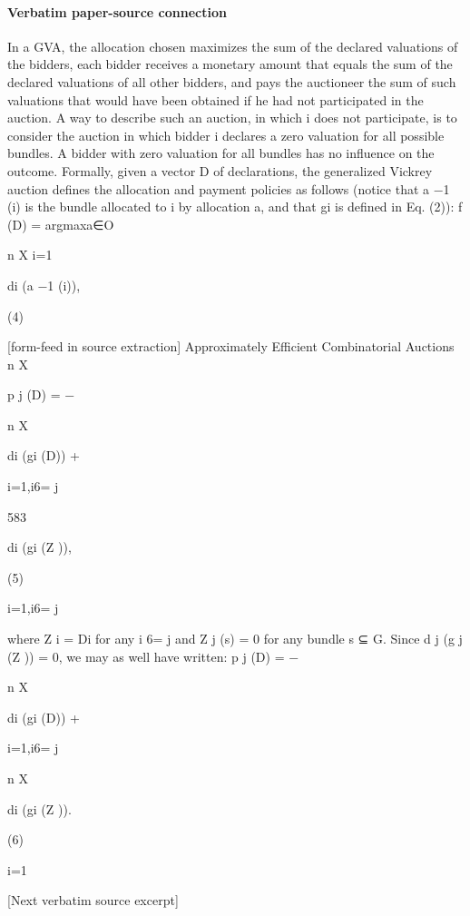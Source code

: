 \documentclass[10pt]{article}
\begin{document}
\paragraph{Verbatim paper-source connection}
\begin{ReviewVerbatim}
In a GVA, the allocation chosen maximizes the sum of the declared valuations
of the bidders, each bidder receives a monetary amount that equals the sum of the
declared valuations of all other bidders, and pays the auctioneer the sum of such
valuations that would have been obtained if he had not participated in the auction.
A way to describe such an auction, in which i does not participate, is to consider
the auction in which bidder i declares a zero valuation for all possible bundles. A
bidder with zero valuation for all bundles has no influence on the outcome.
Formally, given a vector D of declarations, the generalized Vickrey auction
defines the allocation and payment policies as follows (notice that a −1 (i) is the
bundle allocated to i by allocation a, and that gi is defined in Eq. (2)):
f (D) = argmaxa∈O

n
X
i=1

di (a −1 (i)),

(4)


[form-feed in source extraction]
Approximately Efficient Combinatorial Auctions
n
X

p j (D) = −

n
X

di (gi (D)) +

i=1,i6= j

583

di (gi (Z )),

(5)

i=1,i6= j

where Z i = Di for any i 6= j and Z j (s) = 0 for any bundle s ⊆ G. Since
d j (g j (Z )) = 0, we may as well have written:
p j (D) = −

n
X

di (gi (D)) +

i=1,i6= j

n
X

di (gi (Z )).

(6)

i=1

[Next verbatim source excerpt]


\end{ReviewVerbatim}
\end{document}
